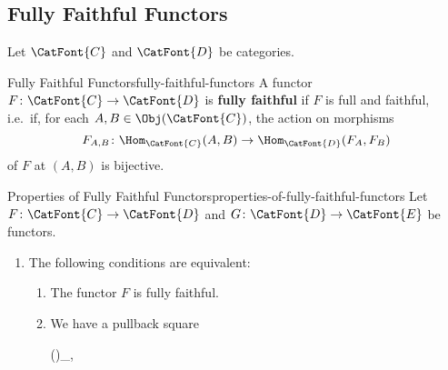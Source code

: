 \subsection{Fully Faithful Functors}\label{subsection-fully-faithful-functors}
Let $\CatFont{C}$ and $\CatFont{D}$ be categories.
\begin{definition}{Fully Faithful Functors}{fully-faithful-functors}%
    A functor $F\colon\CatFont{C}\to\CatFont{D}$ is \textbf{fully faithful} if $F$ is full and faithful, i.e.\ if, for each $A,B\in\Obj(\CatFont{C})$, the action on morphisms
    \[
        F_{A,B}
        \colon
        \Hom_{\CatFont{C}}(A,B)
        \to
        \Hom_{\CatFont{D}}(F_{A},F_{B})
    \]%
    of $F$ at $(A,B)$ is bijective.
\end{definition}
\begin{proposition}{Properties of Fully Faithful Functors}{properties-of-fully-faithful-functors}%
    Let $F\colon\CatFont{C}\to\CatFont{D}$ and $G\colon\CatFont{D}\to\CatFont{E}$ be functors.
    \begin{enumerate}
        \item\label{properties-of-fully-faithful-functors-characterisations}The following conditions are equivalent:
            \begin{enumerate}
                \item\label{properties-of-fully-faithful-functors-characterisations-a}The functor $F$ is fully faithful.
                \item\label{properties-of-fully-faithful-functors-characterisations-b}We have a pullback square
                    \begin{webcompile}
                        \cong%
                        (\times{})\times_{\times{}},%
                        \quad
\end{webcompile}
\end{enumerate}
\end{enumerate}
\end{proposition}
